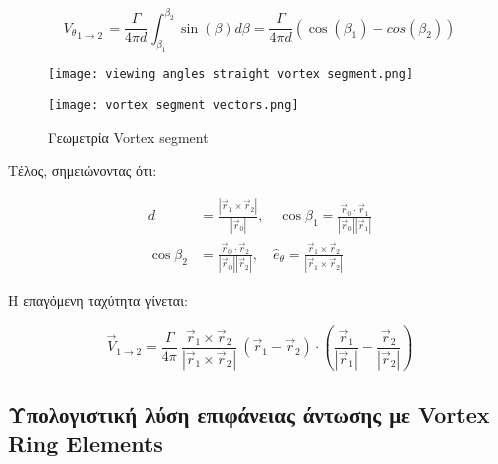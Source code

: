 \begin{equation}
{V_{\theta}}_{1 \rightarrow 2\ } = \frac{\Gamma}{4\pi d}\int_{\beta_{1}}^{\beta_{2}}{\sin(\beta)d\beta =}\frac{\Gamma}{4\pi d}\left( \cos\left( \beta_{1} \right) - cos\left( \beta_{2} \right) \right)
\end{equation}

\begin{figure}[H]
  \centering
  \begin{minipage}{0.49\textwidth}
      \centering
      \texttt{[image: viewing angles straight vortex segment.png]}
  \end{minipage}
  \hfill
  \begin{minipage}{0.49\textwidth}
      \centering
      \texttt{[image: vortex segment vectors.png]}

  \end{minipage}
  \caption{Γεωμετρία \textlatin{Vortex segment \cite{katz2001}}}
  \label{fig:Vortex segment geometry}

\end{figure}

Τέλος, σημειώνοντας ότι:

\begin{align*}
  d &= \frac{\left| \vec{r}_1 \times \vec{r}_2 \right|}{|\vec{r}_0|}, \quad
  \cos\beta_1 = \frac{\vec{r}_0 \cdot \vec{r}_1}{|\vec{r}_0| |\vec{r}_1|} \\
  \cos\beta_2 &= \frac{\vec{r}_0 \cdot \vec{r}_2}{|\vec{r}_0| |\vec{r}_2|}, \quad
  \hat{e}_\theta = \frac{\vec{r}_1 \times \vec{r}_2}{\left| \vec{r}_1 \times \vec{r}_2 \right|}
\end{align*}



Η επαγόμενη ταχύτητα γίνεται:

\begin{equation}
    \label{eq:V12}
{\vec{V}}_{1 \rightarrow 2} = \frac{\Gamma}{4\pi}\ \frac{{\vec{r}}_{1} \times {\vec{r}}_{2}}{\left| {\vec{r}}_{1} \times {\vec{r}}_{2} \right|}\ ({\vec{r}}_{1} - {\vec{r}}_{2}) \cdot \left( \frac{{\vec{r}}_{1}}{\left| {\vec{r}}_{1} \right|} - \frac{{\vec{r}}_{2}}{\left| {\vec{r}}_{2} \right|} \right)
\end{equation}


\subsection{Υπολογιστική λύση επιφάνειας άντωσης με \textlatin{Vortex Ring Elements}}
\label{lifting-surface-computational-solution-by-vortex-ring-elements}


